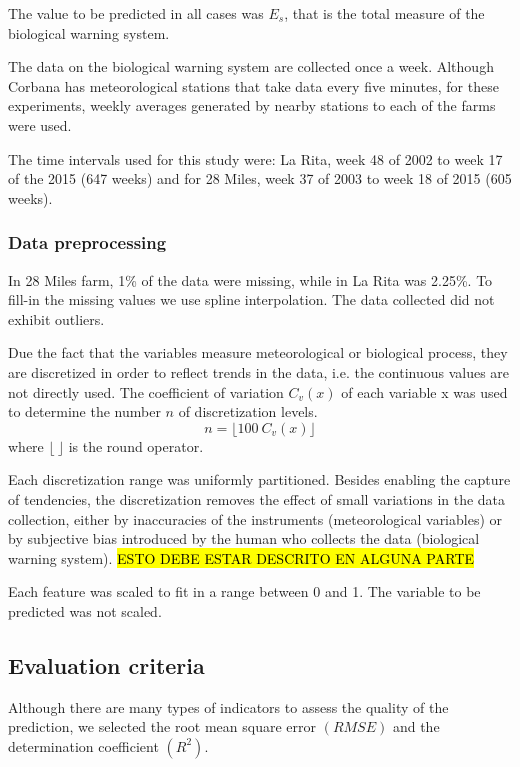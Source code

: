 \documentclass[review]{elsarticle}
\begin{document}
The value to be predicted in all cases was $E_s$, that is the total measure of the biological warning system.  

The data on the biological warning system are collected once a week. Although Corbana has meteorological stations that take data every five minutes, for these experiments, weekly averages generated by nearby stations to each of the farms were used.

The time intervals used for this study were: La Rita, week 48 of 2002 to week 17 of the 2015 (647 weeks) and for 28 Miles, week 37 of 2003 to week 18 of 2015 (605 weeks).

\subsubsection{Data preprocessing}

In 28 Miles farm, 1\% of the data were missing, while in La Rita was 2.25\%. To fill-in the missing values we use spline interpolation. The data collected did not exhibit outliers.

Due the fact that the variables measure meteorological or biological process, they are discretized in order to reflect trends in the data, i.e. the continuous values are not directly used. The coefficient of variation $C_v(x)$ of each variable x was used to determine the number $n$ of discretization levels.
$$n= \lfloor 100 \ C_v(x) \rfloor$$
where $\lfloor \ \rfloor$  is the round operator.

Each discretization range was uniformly partitioned. Besides enabling the capture of tendencies, the discretization removes the effect of small variations in the data collection, either by inaccuracies of the instruments (meteorological variables) or by subjective bias introduced by the human who collects the data (biological warning system). \hl{ESTO DEBE ESTAR DESCRITO EN ALGUNA PARTE}

Each feature was scaled to fit in a range between 0 and 1. The variable to be predicted was not scaled.

\subsection{Evaluation criteria}

Although there are many types of indicators to assess the quality of the prediction, we selected the root mean square error $(RMSE)$ and the determination coefficient $(R^2)$.  
\end{document}

